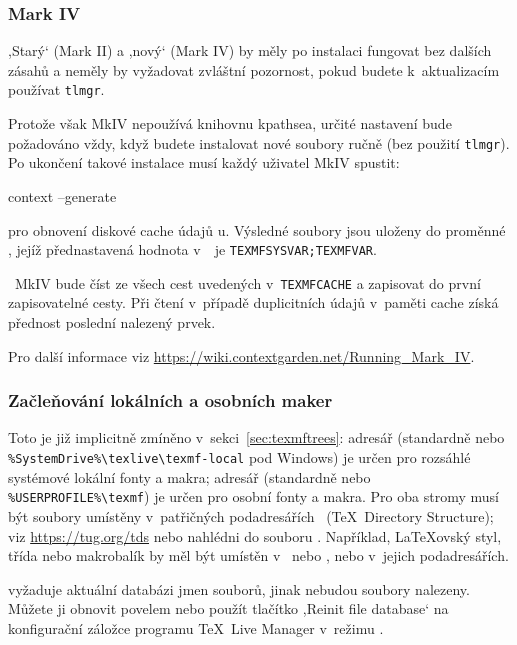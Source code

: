\documentclass[\classoptions,slovak,english,czech]{\classname}
\newcommand{\singleuv}[1]{,#1`}
\begin{document}
\subsubsection{\protect\ConTeXt{} Mark IV}
\label{sec:context_mkiv}

\singleuv{Starý} \ConTeXt{} (Mark II) a \singleuv{nový} \ConTeXt{}
(Mark IV) by měly po instalaci \TL{} fungovat bez dalších zásahů
a neměly by vyžadovat zvláštní pozornost, pokud budete k~aktualizacím 
používat \verb+tlmgr+.

Protože však \ConTeXt{} MkIV nepoužívá knihovnu kpathsea, 
určité nastavení bude požadováno vždy, když budete instalovat nové 
soubory ručně (bez použití \verb+tlmgr+). Po ukončení takové instalace 
musí každý uživatel MkIV spustit:
\begin{sverbatim}
context --generate
\end{sverbatim}
pro obnovení diskové cache údajů \ConTeXt{}u.
Výsledné soubory jsou uloženy do proměnné ,
jejíž přednastavená hodnota v~\TL\ je \verb+TEXMFSYSVAR;TEXMFVAR+. 

\ConTeXt\ MkIV bude číst ze všech cest uvedených 
v~\verb+TEXMFCACHE+ a zapisovat do první zapisovatelné cesty. 
Při čtení v~případě duplicitních údajů v~paměti cache získá
přednost poslední nalezený prvek.

Pro další informace viz
\url{https://wiki.contextgarden.net/Running_Mark_IV}.


\subsubsection{Začleňování lokálních a osobních maker}
\label{sec:local_personal_macros}

Toto je již implicitně zmíněno v~sekci~\ref{sec:texmftrees}:
adresář  (standardně 
 nebo
\verb|%SystemDrive%\texlive\texmf-local| pod Windows)
je určen pro rozsáhlé systémové %
lokální fonty a makra; adresář
 (standardně  nebo
\verb|%USERPROFILE%\texmf|) je určen pro osobní fonty a makra.
Pro oba stromy musí být soubory umístěny v~patřičných 
podadresářích \TDS\ (\TeX\ Directory Structure);
viz \url{https://tug.org/tds} nebo nahlédni do souboru
. Například, \LaTeX{}ovský 
styl, třída nebo makrobalík by měl být umístěn
v~ nebo
, nebo v~jejich podadresářích.

 vyžaduje aktuální databázi jmen souborů, jinak
nebudou soubory nalezeny.
Můžete ji obnovit povelem  nebo použít tlačítko
\singleuv{Reinit file database} na konfigurační záložce programu
\TeX\ Live Manager v~režimu \GUI.
\end{document}
